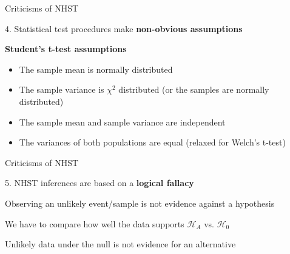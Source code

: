 \documentclass[12pt,aspectratio=169]{beamer}
\begin{document}
\begin{frame}{Criticisms of NHST}

4. Statistical test procedures make \textbf{non-obvious assumptions}
\pause

\textbf{Student's t-test assumptions}

\begin{itemize}
\item The sample mean is normally distributed
\item The sample variance is $\chi^2$ distributed (or the samples are normally distributed)
\item The sample mean and sample variance are independent
\item The variances of both populations are equal (relaxed for Welch's t-test)
\end{itemize}


\end{frame}

\begin{frame}{Criticisms of NHST}

5. NHST inferences are based on a \textbf{logical fallacy}
\pause\newline

Observing an unlikely event/sample is not evidence against a hypothesis
\pause\newline

We have to compare how well the data supports $\mathcal{H}_A$ vs. $\mathcal{H}_0$
\pause\newline

Unlikely data under the null is not evidence for an alternative

\end{frame}



\end{document}
